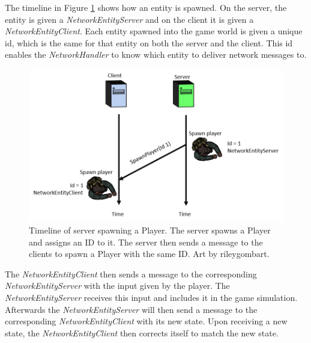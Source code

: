The timeline in Figure \ref{fig:clientServerEntities} shows how an entity is spawned.
On the server, the entity is given a \emph{NetworkEntityServer} and on the client it is given a \emph{NetworkEntityClient}.
Each entity spawned into the game world is given a unique id, which is the same for that entity on both the server and the client.
This id enables the \emph{NetworkHandler} to know which entity to deliver network messages to.

\begin{figure}[H]
\centering
\includegraphics[scale=1]{figures/network/clientServerEntities}
\caption{Timeline of server spawning a Player. The server spawns a Player and assigns an ID to it. The server then sends a message to the clients to spawn a Player with the same ID. Art by rileygombart\cite{artist}.}
\label{fig:clientServerEntities}
\end{figure}

The \emph{NetworkEntityClient} then sends a message to the corresponding \emph{NetworkEntityServer} with the input given by the player.
The \emph{NetworkEntityServer} receives this input and includes it in the game simulation.
Afterwards the \emph{NetworkEntityServer} will then send a message to the corresponding \emph{NetworkEntityClient} with its new state.
Upon receiving a new state, the \emph{NetworkEntityClient} then corrects itself to match the new state.
